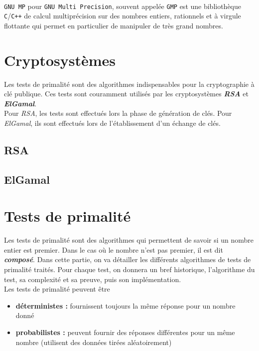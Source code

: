 		\paragraph{}\lstinline!GNU MP! pour \lstinline!GNU Multi Precision!, souvent appelée \lstinline!GMP! est une bibliothèque \lstinline!C!/\lstinline!C++! de calcul multiprécision sur des nombres entiers, rationnels et à virgule flottante qui permet en particulier de manipuler de très grand nombres.
	
	\section{Cryptosystèmes}
		Les tests de primalité sont des algorithmes indispensables pour la cryptographie à clé publique. Ces tests sont couramment utilisés par les cryptosystèmes \textbf{\textit{RSA}} et \textbf{\textit{ElGamal}}.\\
		Pour \textit{RSA}, les tests sont effectués lors la phase de génération de clés. Pour \textit{ElGamal}, ils sont effectués lors de l'établissement d'un échange de clés.
		
		\subsection{RSA}
		
		\subsection{ElGamal}
		
		
	\section{Tests de primalité}
		Les tests de primalité sont des algorithmes qui permettent de savoir si un nombre entier est premier. Dans le cas où le nombre n'est pas premier, il est dit \textbf{\textit{composé}}. Dans cette partie, on va détailler les différents algorithmes de tests de primalité traités. Pour chaque test, on donnera un bref historique, l'algorithme du test, sa complexité et sa preuve, puis son implémentation.\\
		Les tests de primalité peuvent être
		\begin{itemize}
			\item \textbf{déterministes :} fournissent toujours la même réponse pour un nombre donné
			\item \textbf{probabilistes :} peuvent fournir des réponses différentes pour un même nombre (utilisent des données tirées aléatoirement)
		\end{itemize}
		
